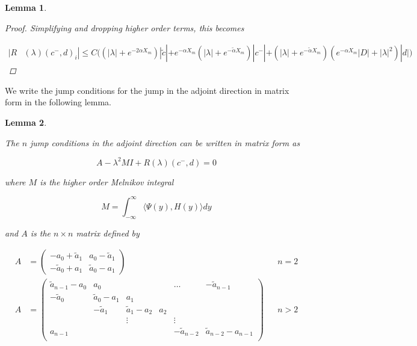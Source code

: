 \documentclass[12pt]{article}
\newtheorem{lemma}{Lemma}
\begin{document}
\begin{lemma}
\begin{proof}
Simplifying and dropping higher order terms, this becomes

\begin{align*}
|R&(\lambda)(c^-, d)_i| \leq C \Big( (|\lambda| + e^{-2 \alpha X_m})|\tilde{c}| + e^{-\alpha X_m}(|\lambda| + e^{-\tilde{\alpha} X_m} )|c^-| + 
(|\lambda| + e^{-\tilde{\alpha} X_m} )( e^{-\alpha X_m} |D| + |\lambda|^2)|d| \Big)
\end{align*}

\end{proof}
\end{lemma}

We write the jump conditions for the jump in the adjoint direction in matrix form in the following lemma.


\begin{lemma}\label{evpsol}

The $n$ jump conditions in the adjoint direction can be written in matrix form as

\begin{equation}\label{adjmatrix}
A - \lambda^2 MI + R(\lambda)(c^-, d) = 0
\end{equation}

where $M$ is the higher order Melnikov integral 

\begin{equation}
M =  \int_{-\infty}^\infty \langle \Psi(y), H(y) \rangle dy
\end{equation}

and $A$ is the $n \times n$ matrix defined by

\begin{align*}
A &= \begin{pmatrix}
-a_0 + \tilde{a}_1 & a_0 - \tilde{a}_1 \\
-\tilde{a}_0 + a_1 & \tilde{a}_0 - a_1
\end{pmatrix} && n = 2 \\
A &= \begin{pmatrix}
\tilde{a}_{n-1} - a_0 & a_0 & & & \dots & -\tilde{a}_{n-1}\\
-\tilde{a}_0 & \tilde{a}_0 - a_1 &  a_1 \\
& -\tilde{a}_1 & \tilde{a}_1 - a_2 &  a_2 \\
& & \vdots & & \vdots \\
a_{n-1} & & & & -\tilde{a}_{n-2} & \tilde{a}_{n-2} - a_{n-1} \\
\end{pmatrix} && n > 2
\end{align*}


\end{lemma}
\end{document}
